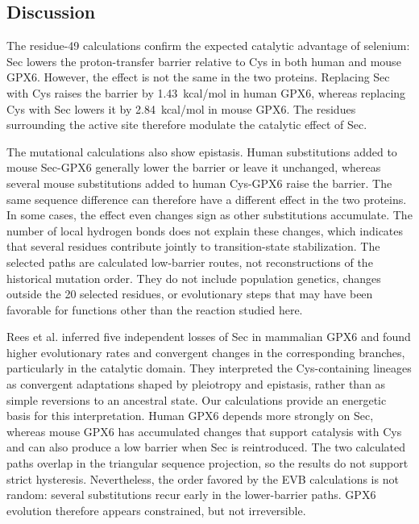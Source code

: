 \subsection{Discussion}

The residue-49 calculations confirm the expected catalytic advantage of selenium: Sec lowers the proton-transfer barrier relative to Cys in both human and mouse GPX6.\cite{Reich2016,prabhakar_elucidation_2005,cardey_selenocysteine_2007,rees_ancient_2024,Kanavos2026SecSelectivity} However, the effect is not the same in the two proteins. Replacing Sec with Cys raises the barrier by 1.43~kcal/mol in human GPX6, whereas replacing Cys with Sec lowers it by 2.84~kcal/mol in mouse GPX6. The residues surrounding the active site therefore modulate the catalytic effect of Sec.\cite{Warshel2006,Kamerlin2010,VillaWarshel2001}

The mutational calculations also show epistasis. Human substitutions added to mouse Sec-GPX6 generally lower the barrier or leave it unchanged, whereas several mouse substitutions added to human Cys-GPX6 raise the barrier. The same sequence difference can therefore have a different effect in the two proteins.\cite{Weinreich2006,starr2016epistasis,storz_compensatory_2018,Kaltenbach2015} In some cases, the effect even changes sign as other substitutions accumulate. The number of local hydrogen bonds does not explain these changes, which indicates that several residues contribute jointly to transition-state stabilization. The selected paths are calculated low-barrier routes, not reconstructions of the historical mutation order. They do not include population genetics, changes outside the 20 selected residues, or evolutionary steps that may have been favorable for functions other than the reaction studied here.

Rees et al. inferred five independent losses of Sec in mammalian GPX6 and found higher evolutionary rates and convergent changes in the corresponding branches, particularly in the catalytic domain.\cite{rees_ancient_2024} They interpreted the Cys-containing lineages as convergent adaptations shaped by pleiotropy and epistasis, rather than as simple reversions to an ancestral state. Our calculations provide an energetic basis for this interpretation. Human GPX6 depends more strongly on Sec, whereas mouse GPX6 has accumulated changes that support catalysis with Cys and can also produce a low barrier when Sec is reintroduced. The two calculated paths overlap in the triangular sequence projection, so the results do not support strict hysteresis. Nevertheless, the order favored by the EVB calculations is not random: several substitutions recur early in the lower-barrier paths. GPX6 evolution therefore appears constrained, but not irreversible.

